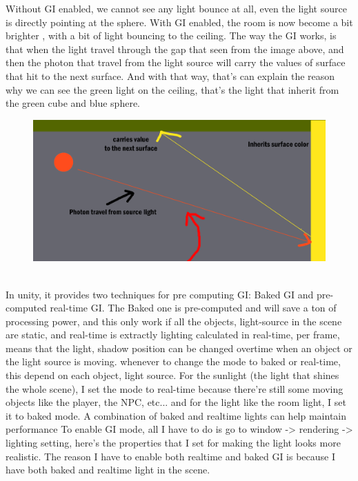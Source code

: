 \documentclass[a4paper, 13pt]{extarticle}
\begin{document}
{\begin{figure}[h]
 \end{figure}
 Without GI enabled, we cannot see any light bounce at all, even the light source is directly pointing at the sphere. With GI enabled, the room is now become a bit brighter , with a bit of light bouncing to the ceiling. The way the GI works, is that when the light travel through the gap that seen from the image above, and then the photon that travel from the light source will carry the values of surface that hit to the next surface. And with that way, that's can explain the reason why we can see the green light on the ceiling, that's the light that inherit from the green cube and blue sphere. 
  \begin{figure}[h]
 	\begin{minipage}{1\textwidth}
 		\centering
 		\includegraphics[width=0.8\linewidth]{intructions/How_light_works.png}
 		\centering
 	\end{minipage}
 \end{figure}
\\[0.05cm]
 In unity, it provides two techniques for pre computing GI: Baked GI and pre-computed real-time GI. The Baked one is pre-computed and will save a ton of processing power, and this only work if all the objects, light-source in the scene are static, and real-time is extractly lighting calculated in real-time, per frame, means that the light, shadow position can be changed overtime when an object or the light source is moving. whenever to change the mode to baked or real-time, this depend on each object, light source. For the sunlight (the light that shines the whole scene), I set the mode to real-time because there're still some moving objects like the player, the NPC, etc... and for the light like the room light, I set it to baked mode. A combination of baked and realtime lights can help maintain performance
 To enable GI mode, all I have to do is go to window -> rendering -> lighting setting, here's the properties that I set for making the light looks more realistic. The reason I have to enable both realtime and baked GI is because I have both baked and realtime light in the scene.
}
\end{document}
